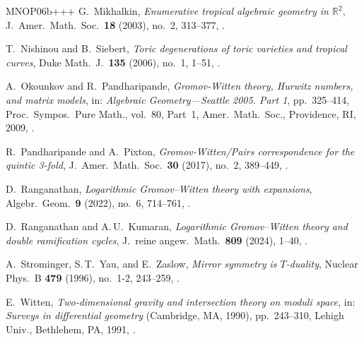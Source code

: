 \begin{thebibliography}{MNOP06b+++}
G.~Mikhalkin, \emph{Enumerative tropical algebraic geometry in $\mathbb{R}^2$},
  J.~Amer.\ Math.\ Soc.\ \textbf{18} (2003), no.~2,
  313--377, .

T.~Nishinou and B.~Siebert, \emph{{Toric degenerations of toric varieties and
  tropical curves}}, Duke Math.~J.\ \textbf{135} (2006), no.~1, 
1--51,  .

A.~Okounkov and R.~Pandharipande, \emph{Gromov-Witten theory, {H}urwitz
  numbers, and matrix models}, in: \emph{Algebraic Geometry---{S}eattle 2005. {P}art 1}, pp.~325--414, Proc.\ Sympos.\ Pure Math., vol.~80, Part~1, Amer.\ Math.\ Soc., Providence, RI, 2009, .


R.~Pandharipande and A.~Pixton, \emph{Gromov-{W}itten/{P}airs correspondence
  for the quintic 3-fold}, J.~Amer.\ Math.\ Soc.\ \textbf{30} (2017), no.~2,
  389--449, .

D.~Ranganathan, \emph{Logarithmic Gromov--Witten theory with expansions},
  Algebr.\ Geom.\ \textbf{9} (2022), no.~6, 
714--761, .
  
D.~Ranganathan and A.\,U.~Kumaran, \emph{Logarithmic {G}romov--{W}itten theory and double ramification cycles}, J.~reine angew.\ Math.\ \textbf{809} (2024),
1--40, .

A.~Strominger, S.\,T.~Yau, and E.~Zaslow, \emph{Mirror symmetry is
  {$T$}-duality}, Nuclear Phys.~B \textbf{479} (1996), no.~1-2, 
243--259,  .

E.~Witten, \emph{Two-dimensional gravity and intersection theory on moduli
  space}, in: \emph{Surveys in differential geometry} ({C}ambridge, {MA}, 1990), pp.~243--310,  Lehigh Univ., Bethlehem, PA, 1991, .

\end{thebibliography}
